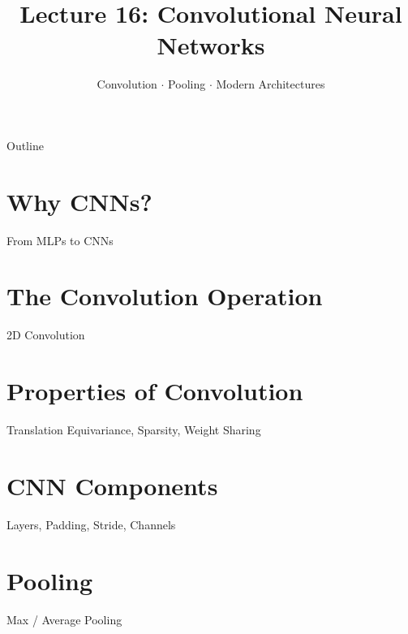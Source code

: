 \documentclass[aspectratio=169]{beamer}
\title{Lecture 16: Convolutional Neural Networks}
\subtitle{Convolution $\cdot$ Pooling $\cdot$ Modern Architectures}
\date{}
\begin{document}
\begin{frame}\titlepage\end{frame}

\begin{frame}{Outline}
  \tableofcontents
\end{frame}

\section{Why CNNs?}
\begin{frame}{From MLPs to CNNs}
\end{frame}

\section{The Convolution Operation}
\begin{frame}{2D Convolution}
\end{frame}

\section{Properties of Convolution}
\begin{frame}{Translation Equivariance, Sparsity, Weight Sharing}
\end{frame}

\section{CNN Components}
\begin{frame}{Layers, Padding, Stride, Channels}
\end{frame}

\section{Pooling}
\begin{frame}{Max / Average Pooling}
\end{frame}
\end{document}
